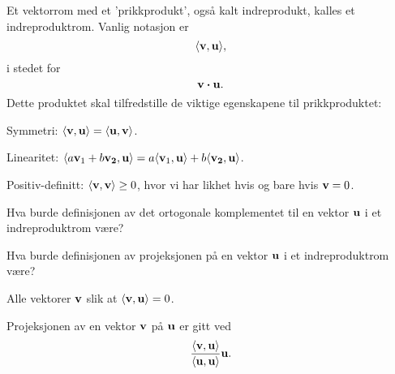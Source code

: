 \begin{oppgave}
Et vektorrom med et 'prikkprodukt', også kalt indreprodukt, kalles et indreproduktrom. Vanlig notasjon er $$\langle \mathbf{v},\mathbf{u} \rangle,$$ i stedet for $$\mathbf{v}\boldsymbol{\cdot}\mathbf{u}.$$ Dette produktet skal tilfredstille de viktige egenskapene til prikkproduktet:

\noindent
Symmetri: $\langle \mathbf{v}, \mathbf{u}\rangle =\langle \mathbf{u}, \mathbf{v}\rangle$.

\noindent
Linearitet: $\langle a\mathbf{v}_1+b\mathbf{v_2}, \mathbf{u}\rangle =a\langle \mathbf{v}_1, \mathbf{u}\rangle+b\langle \mathbf{v_2}, \mathbf{u}\rangle$.

\noindent
Positiv-definitt: $\langle \mathbf{v}, \mathbf{v}\rangle \geq 0$, hvor vi har likhet hvis og bare hvis $\mathbf{v}=0$.

\begin{punkt}
Hva burde definisjonen av det ortogonale komplementet til en vektor $\mathbf{u}$ i et indreproduktrom være?
\end{punkt}

\begin{punkt}
Hva burde definisjonen av projeksjonen på en vektor $\mathbf{u}$ i et indreproduktrom være?
\end{punkt}


\end{oppgave}
\begin{losning}
\begin{punkt}
Alle vektorer $\mathbf{v}$ slik at $\langle \mathbf{v}, \mathbf{u}\rangle=0$.
\end{punkt}

\begin{punkt}
Projeksjonen av en vektor $\mathbf{v}$ på $\mathbf{u}$ er gitt ved $$\frac{\langle \mathbf{v}, \mathbf{u}\rangle}{\langle \mathbf{u}, \mathbf{u}\rangle} \mathbf{u}.$$
\end{punkt}
\end{losning}

